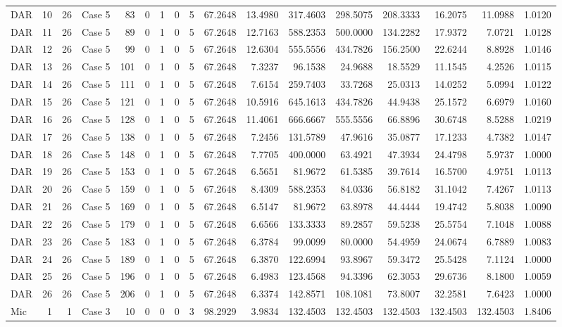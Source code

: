 \documentclass[
  12pt,
  letterpaper,
  DIV=11,
  numbers=noendperiod]{scrartcl}
\begin{document}
\begin{table}[!h]
{\begin{tabular}[t]{lrrlrrrrrrrrrrrrr}
DAR & 10 & 26 & Case 5 & 83 & 0 & 1 & 0 & 5 & 67.2648 & 13.4980 & 317.4603 & 298.5075 & 208.3333 & 16.2075 & 11.0988 & 1.0120\\
DAR & 11 & 26 & Case 5 & 89 & 0 & 1 & 0 & 5 & 67.2648 & 12.7163 & 588.2353 & 500.0000 & 134.2282 & 17.9372 & 7.0721 & 1.0128\\
DAR & 12 & 26 & Case 5 & 99 & 0 & 1 & 0 & 5 & 67.2648 & 12.6304 & 555.5556 & 434.7826 & 156.2500 & 22.6244 & 8.8928 & 1.0146\\
DAR & 13 & 26 & Case 5 & 101 & 0 & 1 & 0 & 5 & 67.2648 & 7.3237 & 96.1538 & 24.9688 & 18.5529 & 11.1545 & 4.2526 & 1.0115\\
\addlinespace
DAR & 14 & 26 & Case 5 & 111 & 0 & 1 & 0 & 5 & 67.2648 & 7.6154 & 259.7403 & 33.7268 & 25.0313 & 14.0252 & 5.0994 & 1.0122\\
DAR & 15 & 26 & Case 5 & 121 & 0 & 1 & 0 & 5 & 67.2648 & 10.5916 & 645.1613 & 434.7826 & 44.9438 & 25.1572 & 6.6979 & 1.0160\\
DAR & 16 & 26 & Case 5 & 128 & 0 & 1 & 0 & 5 & 67.2648 & 11.4061 & 666.6667 & 555.5556 & 66.8896 & 30.6748 & 8.5288 & 1.0219\\
DAR & 17 & 26 & Case 5 & 138 & 0 & 1 & 0 & 5 & 67.2648 & 7.2456 & 131.5789 & 47.9616 & 35.0877 & 17.1233 & 4.7382 & 1.0147\\
DAR & 18 & 26 & Case 5 & 148 & 0 & 1 & 0 & 5 & 67.2648 & 7.7705 & 400.0000 & 63.4921 & 47.3934 & 24.4798 & 5.9737 & 1.0000\\
\addlinespace
DAR & 19 & 26 & Case 5 & 153 & 0 & 1 & 0 & 5 & 67.2648 & 6.5651 & 81.9672 & 61.5385 & 39.7614 & 16.5700 & 4.9751 & 1.0113\\
DAR & 20 & 26 & Case 5 & 159 & 0 & 1 & 0 & 5 & 67.2648 & 8.4309 & 588.2353 & 84.0336 & 56.8182 & 31.1042 & 7.4267 & 1.0113\\
DAR & 21 & 26 & Case 5 & 169 & 0 & 1 & 0 & 5 & 67.2648 & 6.5147 & 81.9672 & 63.8978 & 44.4444 & 19.4742 & 5.8038 & 1.0090\\
DAR & 22 & 26 & Case 5 & 179 & 0 & 1 & 0 & 5 & 67.2648 & 6.6566 & 133.3333 & 89.2857 & 59.5238 & 25.5754 & 7.1048 & 1.0088\\
DAR & 23 & 26 & Case 5 & 183 & 0 & 1 & 0 & 5 & 67.2648 & 6.3784 & 99.0099 & 80.0000 & 54.4959 & 24.0674 & 6.7889 & 1.0083\\
\addlinespace
DAR & 24 & 26 & Case 5 & 189 & 0 & 1 & 0 & 5 & 67.2648 & 6.3870 & 122.6994 & 93.8967 & 59.3472 & 25.5428 & 7.1124 & 1.0000\\
DAR & 25 & 26 & Case 5 & 196 & 0 & 1 & 0 & 5 & 67.2648 & 6.4983 & 123.4568 & 94.3396 & 62.3053 & 29.6736 & 8.1800 & 1.0059\\
DAR & 26 & 26 & Case 5 & 206 & 0 & 1 & 0 & 5 & 67.2648 & 6.3374 & 142.8571 & 108.1081 & 73.8007 & 32.2581 & 7.6423 & 1.0000\\
Mic & 1 & 1 & Case 3 & 10 & 0 & 0 & 0 & 3 & 98.2929 & 3.9834 & 132.4503 & 132.4503 & 132.4503 & 132.4503 & 132.4503 & 1.8406\\
\bottomrule
\end{tabular}}
\end{table}
\end{document}
